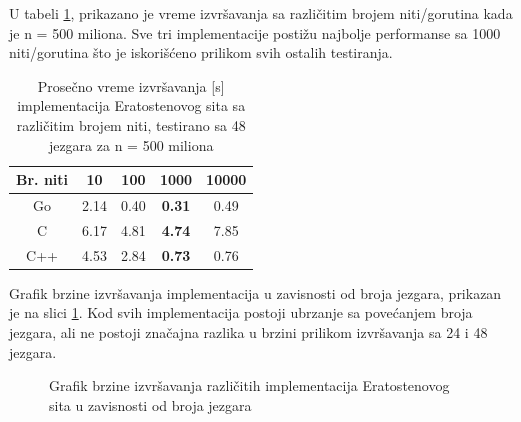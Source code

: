 \documentclass[12pt,oneside]{memoir}
\begin{document}
U tabeli \ref{tab:prime5}, prikazano je vreme izvršavanja sa različitim brojem niti/gorutina kada je n = 500 miliona. Sve tri implementacije postižu najbolje performanse sa 1000 niti/gorutina što je iskorišćeno prilikom svih ostalih testiranja.

\begin{table}
\begin{center}
\caption{Prosečno vreme izvršavanja [s] implementacija Eratostenovog sita sa različitim brojem niti, testirano sa 48 jezgara za n = 500 miliona}
\begin{tabular}{||c||c c c c||}
\hline
Br. niti		&10 &100 &1000 &10000\\ \hline
Go	&2.14	&0.40	&\textbf{0.31}&0.49\\ \hline
C	&6.17	&4.81	&\textbf{4.74}&7.85\\ \hline
C++  &4.53	&2.84	&\textbf{0.73}&0.76\\ \hline
\end{tabular}
\label{tab:prime5}
\end{center}
\end{table}


Grafik brzine izvršavanja implementacija u zavisnosti od broja jezgara, prikazan je na slici \ref{fig:prime3}. Kod svih implementacija postoji ubrzanje sa povećanjem broja jezgara, ali ne postoji značajna razlika u brzini prilikom izvršavanja sa 24 i 48 jezgara.
\\

\begin{figure}
\begin{center}


\caption{Grafik brzine izvršavanja različitih implementacija Eratostenovog sita u zavisnosti od broja jezgara}
\label{fig:prime3}
\end{center}
\end{figure}
\end{document}
